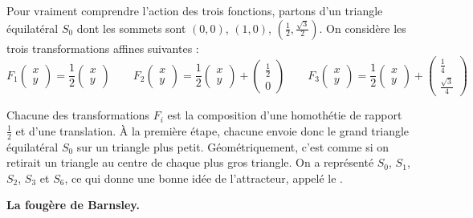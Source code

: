 \documentclass[11pt,class=report,crop=false]{standalone}
\begin{document}
Pour vraiment comprendre l'action des trois fonctions, partons d'un triangle équilatéral $S_0$ dont les sommets sont $(0,0)$,
$(1,0)$, $(\frac12,\frac{\sqrt3}{2})$. On considère les trois transformations affines suivantes :
$$F_1 \begin{pmatrix}x \\ y \end{pmatrix} = \frac12 \begin{pmatrix}x \\ y \end{pmatrix} \qquad
F_2\begin{pmatrix}x \\ y \end{pmatrix} = \frac12 \begin{pmatrix}x \\ y \end{pmatrix}+ \begin{pmatrix} \frac12 \\ 0 \end{pmatrix} \qquad
F_3\begin{pmatrix}x \\ y \end{pmatrix} = \frac12 \begin{pmatrix}x \\ y \end{pmatrix}+ \begin{pmatrix}\frac14 \\ \frac{\sqrt3}{4} \end{pmatrix}
$$

Chacune des transformations $F_i$ est la composition d'une homothétie de rapport $\frac12$ et d'une translation.
\`A la première étape, chacune envoie donc le grand triangle équilatéral $S_0$ sur un triangle plus petit.
Géométriquement, c'est comme si on retirait un triangle au centre de chaque plus gros triangle.
On a représenté $S_0$, $S_1$, $S_2$, $S_3$ et $S_6$, ce qui donne une bonne idée
de l'attracteur, appelé le .


\bigskip

\textbf{La fougère de Barnsley.}
\end{document}

